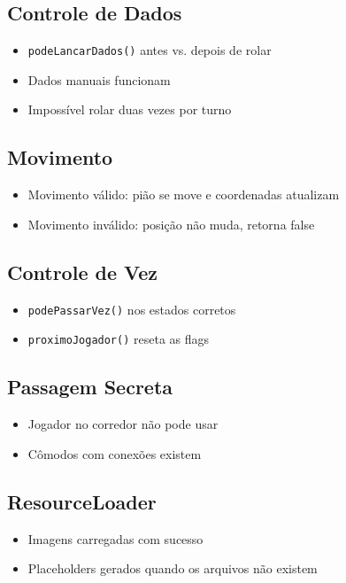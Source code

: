 \documentclass[12pt,a4paper]{report}
\begin{document}
\subsection{Controle de Dados}
\begin{itemize}
    \item \texttt{podeLancarDados()} antes vs. depois de rolar
    \item Dados manuais funcionam
    \item Impossível rolar duas vezes por turno
\end{itemize}

\subsection{Movimento}
\begin{itemize}
    \item Movimento válido: pião se move e coordenadas atualizam
    \item Movimento inválido: posição não muda, retorna false
\end{itemize}

\subsection{Controle de Vez}
\begin{itemize}
    \item \texttt{podePassarVez()} nos estados corretos
    \item \texttt{proximoJogador()} reseta as flags
\end{itemize}

\subsection{Passagem Secreta}
\begin{itemize}
    \item Jogador no corredor não pode usar
    \item Cômodos com conexões existem
\end{itemize}

\subsection{ResourceLoader}
\begin{itemize}
    \item Imagens carregadas com sucesso
    \item Placeholders gerados quando os arquivos não existem
\end{itemize}
\end{document}
